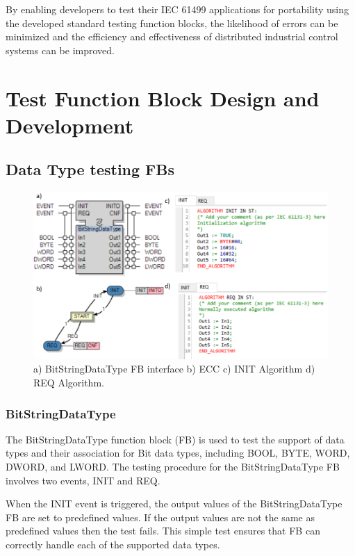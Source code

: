 \begin{bibunit}
By enabling developers to test their IEC 61499 applications for portability using the developed standard testing function blocks, the likelihood of errors can be minimized and the efficiency and effectiveness of distributed industrial control systems can be improved.



\section{Test Function Block Design and Development }
\label{sec:mainSec}



\subsection{Data Type testing FBs}
\begin{figure}[!b]
    \centering
    \includegraphics[width=\columnwidth]{MX_Papers/Paper8/Figures/BSDT.PNG}
    \caption{a) BitStringDataType FB interface b) ECC c) INIT Algorithm d) REQ Algorithm.} 
    \label{fig:BSDT}
\end{figure}



\subsubsection{BitStringDataType}

The BitStringDataType function block (FB) is used to test the support of data types and their association for Bit data types, including BOOL, BYTE, WORD, DWORD, and LWORD. The testing procedure for the BitStringDataType FB involves two events, INIT and REQ.

When the INIT event is triggered, the output values of the BitStringDataType FB are set to predefined values. If the output values are not the same as  predefined values then the test fails. This simple test ensures that FB can correctly handle each of the supported data types.


\end{bibunit}
